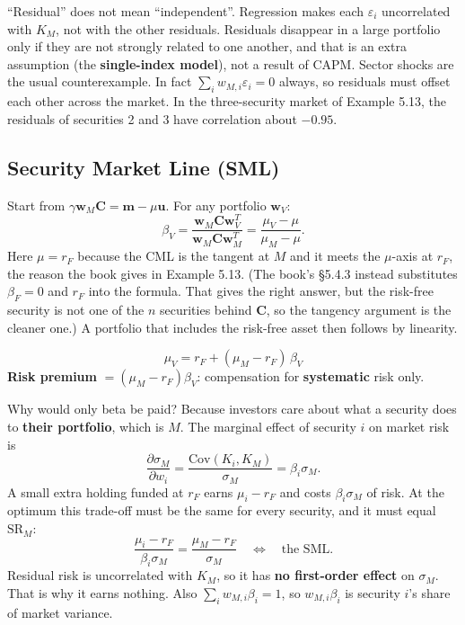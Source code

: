 \documentclass[titlepage,11pt,a4paper]{article}
\newcommand{\Cov}{\mathrm{Cov}}
\newcommand{\vw}{\boldsymbol{w}}
\newcommand{\vm}{\boldsymbol{m}}
\newcommand{\vu}{\boldsymbol{u}}
\newcommand{\vC}{\boldsymbol{C}}
\newcommand{\T}{^{T}}
\newcommand{\SR}{\mathrm{SR}}
\begin{document}
\begin{caution}
``Residual'' does not mean ``independent''. Regression makes each $\varepsilon_i$ uncorrelated with $K_M$, not with the other residuals. Residuals disappear in a large portfolio only if they are not strongly related to one another, and that is an extra assumption (the \textbf{single-index model}), not a result of CAPM. Sector shocks are the usual counterexample. In fact $\sum_iw_{M,i}\varepsilon_i=0$ always, so residuals must offset each other across the market. In the three-security market of Example 5.13, the residuals of securities 2 and 3 have correlation about $-0.95$.
\end{caution}

\subsection{Security Market Line (SML)}
Start from $\gamma\vw_M\vC=\vm-\mu\vu$. For any portfolio $\vw_V$:
\[\beta_V=\frac{\vw_M\vC\vw_V\T}{\vw_M\vC\vw_M\T}=\frac{\mu_V-\mu}{\mu_M-\mu}.\]
Here $\mu=r_F$ because the CML is the tangent at $M$ and it meets the $\mu$-axis at $r_F$, the reason the book gives in Example 5.13. (The book's \S5.4.3 instead substitutes $\beta_F=0$ and $r_F$ into the formula. That gives the right answer, but the risk-free security is not one of the $n$ securities behind $\vC$, so the tangency argument is the cleaner one.) A portfolio that includes the risk-free asset then follows by linearity.

\begin{result}
\[\mu_V=r_F+(\mu_M-r_F)\,\beta_V \tag{5.19}\]
\textbf{Risk premium} $=(\mu_M-r_F)\beta_V$: compensation for \textbf{systematic} risk only.
\end{result}

\begin{intuition}
Why would only beta be paid? Because investors care about what a security does to \textbf{their portfolio}, which is $M$. The marginal effect of security $i$ on market risk is
\[\frac{\partial\sigma_M}{\partial w_i}=\frac{\Cov(K_i,K_M)}{\sigma_M}=\beta_i\sigma_M.\]
A small extra holding funded at $r_F$ earns $\mu_i-r_F$ and costs $\beta_i\sigma_M$ of risk. At the optimum this trade-off must be the same for every security, and it must equal $\SR_M$:
\[\frac{\mu_i-r_F}{\beta_i\sigma_M}=\frac{\mu_M-r_F}{\sigma_M}\quad\Longleftrightarrow\quad\text{the SML.}\]
Residual risk is uncorrelated with $K_M$, so it has \textbf{no first-order effect} on $\sigma_M$. That is why it earns nothing. Also $\sum_iw_{M,i}\beta_i=1$, so $w_{M,i}\beta_i$ is security $i$'s share of market variance.
\end{intuition}
\end{document}
